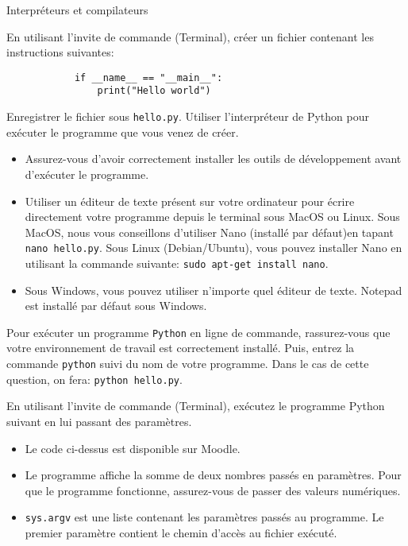 \begin{section}{Interpréteurs et compilateurs}
    \begin{Exercice}[10 minutes]
        En utilisant l'invite de commande (Terminal), créer un fichier contenant les instructions suivantes:
        \begin{lstlisting}
            if __name__ == "__main__":
                print("Hello world")\end{lstlisting}
        Enregistrer le fichier sous \lstinline{hello.py}. Utiliser l'interpréteur de Python pour exécuter le programme que vous venez de créer.
    \end{Exercice}
    \begin{conseil}
        \begin{itemize}
            \item Assurez-vous d'avoir correctement installer les outils de développement avant d'exécuter le programme.
            \item Utiliser un éditeur de texte présent sur votre ordinateur pour écrire directement votre programme depuis le terminal sous MacOS ou Linux. Sous MacOS, nous vous conseillons d'utiliser Nano (installé par défaut)en tapant \lstinline{nano hello.py}. Sous Linux (Debian/Ubuntu), vous pouvez installer Nano en utilisant la commande suivante: \lstinline{sudo apt-get install nano}.
            \item Sous Windows, vous pouvez utiliser n'importe quel éditeur de texte. Notepad est installé par défaut sous Windows.
        \end{itemize}
    \end{conseil}
    \begin{solution}
        Pour exécuter un programme \lstinline{Python} en ligne de commande, rassurez-vous que votre environnement de travail est correctement installé. Puis, entrez la commande \lstinline{python} suivi du nom de votre programme. 
        Dans le cas de cette question, on fera: \lstinline{python hello.py}.
    \end{solution}
    
    \begin{Exercice}[10 minutes]
        En utilisant l'invite de commande (Terminal), exécutez le programme Python suivant en lui passant des paramètres.

        
        
        \begin{conseil}
            \begin{itemize}
                \item Le code ci-dessus est disponible sur Moodle.
                \item Le programme affiche la somme de deux nombres passés en paramètres. Pour que le programme fonctionne, assurez-vous de passer des valeurs numériques.
                \item \lstinline{sys.argv} est une liste contenant les paramètres passés au programme. Le premier paramètre contient le chemin d'accès au fichier exécuté.
            \end{itemize}
        \end{conseil}


\end{Exercice}
\end{section}
